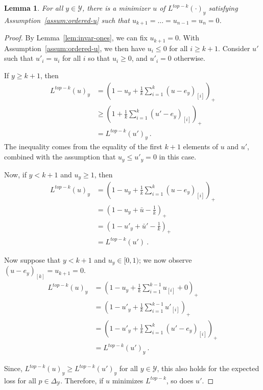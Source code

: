 \documentclass[12pt]{article}
\newcommand{\simplex}{\Delta_\Y}
\newcommand{\Y}{\mathcal{Y}}
\newtheorem{lemma}{Lemma}
\begin{document}
\begin{lemma}\label{lem:extra-elts-zero}
	For all $y \in \Y$, there is a minimizer $u$ of $L^{top-k}(\cdot)_y$ satisfying Assumption~\ref{assum:ordered-u} such that $u_{k+1} = \ldots = u_{n-1} = u_n = 0$.
\end{lemma}
\begin{proof}
	By Lemma~\ref{lem:invar-ones}, we can fix $u_{k+1} = 0$.
	With Assumption~\ref{assum:ordered-u}, we then have $u_i \leq 0$ for all $i \geq k+1$.
	Consider $u'$ such that $u'_i = u_i$ for all $i$ so that $u_i \geq 0$, and $u'_i = 0$ otherwise.
	
	If $y \geq k+1$, then 
	\begin{align*}
	L^{top-k}(u)_y &= (1 - u_y + \frac 1 k \sum_{i=1}^k (u - e_y)_{[i]})_+ \\
	&\geq \left(1 + \frac {1}{k} \sum_{i=1}^k (u' - e_y)_{[i]}\right)_+\\
	&= L^{top-k}(u')_y~.~
	\end{align*}
	The inequality comes from the equality of the first $k+1$ elements of $u$ and $u'$, combined with the assumption that $u_y \leq u'_y = 0$ in this case.
	
	Now, if $y < k+1$ and $u_y \geq 1$, then 
	\begin{align*}
	L^{top-k}(u)_y &= \left(1 - u_y + \frac 1 k \sum_{i=1}^k (u - e_y)_{[i]}\right)_+ \\
	&= \left(1 - u_y + \bar u - \frac 1 k\right)_+\\
	&= \left(1 - u'_y + \bar u' - \frac 1 k\right)_+\\
	&= L^{top-k}(u')~.~
	\end{align*}
	
	Now suppose that $y < k+1$ and $u_y \in [0,1)$; we now observe $(u - e_y)_{[k]} = u_{k+1} = 0$. 
	\begin{align*}
	L^{top-k}(u)_y &= \left(1 - u_y + \frac 1 k \sum_{i=1}^{k-1} u_{[i]} + 0 \right)_+\\
	&= \left(1 - u'_y + \frac 1 k \sum_{i=1}^{k-1} u'_{[i]}\right)_+\\
	&= \left(1 - u'_y + \frac 1 k \sum_{i=1}^{k} (u' - e_y)_{[i]}\right)_+\\
	&= L^{top-k}(u')_y~.~
	\end{align*}

	Since, $L^{top-k}(u)_y \geq L^{top-k}(u')_y$ for all $y \in \Y$, this also holds for the expected loss for all $p \in \simplex$.
	Therefore, if $u$ minimizes $L^{top-k}$, so does $u'$.
\end{proof}
\end{document}
